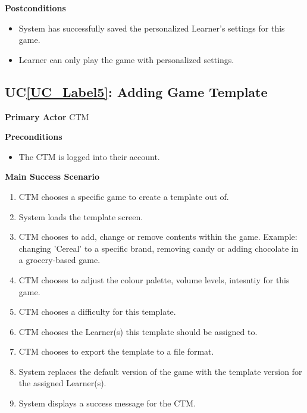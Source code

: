 \documentclass[12pt]{article}
\newcounter{ucnum} %
\newcommand{\ucref}[1]{UC\ref{#1}}
\begin{document}
\textbf{Postconditions}
\begin{itemize}
\item System has successfully saved the personalized Learner's settings for this game.
\item Learner can only play the game with personalized settings.
\end{itemize}

 \label{UC_Label5}
\subsection{\ucref{UC_Label5}: Adding Game Template}

\textbf{Primary Actor}
CTM

\textbf{Preconditions}
\begin{itemize}
\item The CTM is logged into their account.
\end{itemize}

\textbf{Main Success Scenario}
\begin{enumerate}
\item CTM chooses a specific game to create a template out of.
\item System loads the template screen.
\item CTM chooses to add, change or remove contents within the game. Example: changing 'Cereal' to a specific brand, removing candy or adding chocolate in a grocery-based game.
\item CTM chooses to adjust the colour palette, volume levels, intesntiy for this game.
\item CTM chooses a difficulty for this template.
\item CTM chooses the Learner(s) this template should be assigned to.
\item CTM chooses to export the template to a file format.
\item System replaces the default version of the game with the template version for the assigned Learner(s).
\item System displays a success message for the CTM.
\end{enumerate}
\end{document}
